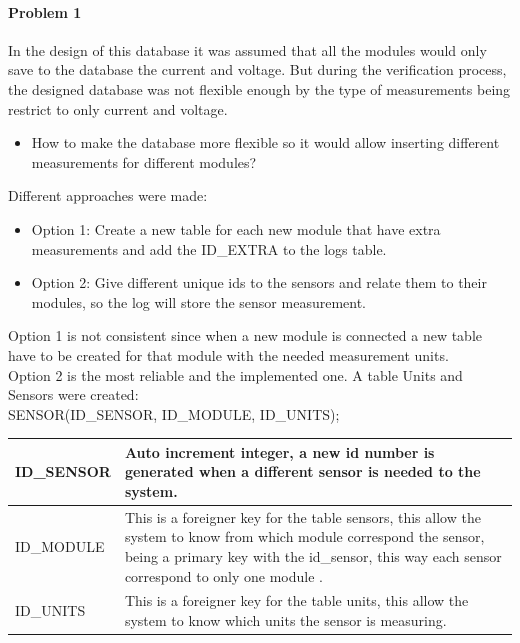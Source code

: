 \paragraph{Problem 1}
In the design of this database it was assumed that all the modules would only save to the database the current and voltage. But during the verification process, the designed database was not flexible enough by the type of measurements being restrict to only current and voltage.

	\begin{itemize}
		\item How to make the database more flexible so it would allow inserting different measurements for different modules?
	\end{itemize}

Different approaches were made:
	
	\begin{itemize}
		\item Option 1: Create a new table for each new module that have extra measurements and add the ID\_EXTRA to the logs table.
		\item Option 2: Give different unique ids to the sensors and relate them to their modules, so the log will store the sensor measurement.
	\end{itemize}

Option 1 is not consistent since when a new module is connected a new table have to be created for that module with the needed measurement units.\\
Option 2 is the most reliable and the implemented one. A table Units and Sensors were created:\\

SENSOR(ID\_SENSOR, ID\_MODULE, ID\_UNITS);

\begin{table}[H]
\centering
	\begin{tabular}{| p{2cm} | p{10cm} |}
		\hline
		ID\_SENSOR & Auto increment integer, a new id number is generated when a different sensor is needed to the system. \\\hline
		ID\_MODULE & This is a foreigner key for the table sensors, this allow the system to know from which module correspond the sensor, being a primary key with the id\_sensor, this way each sensor correspond to only one module .\\\hline
		ID\_UNITS & This is a foreigner key for the table units, this allow the system to know which units the sensor is measuring.\\\hline
	\end{tabular}
\end{table}

